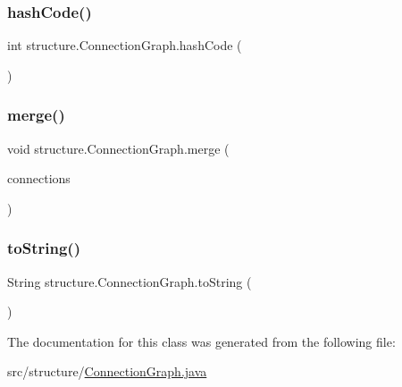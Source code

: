 \mbox{\label{classstructure_1_1_connection_graph_af352a3e79444b178fc8edef545086836}} 
\subsubsection{\texorpdfstring{hash\+Code()}{hashCode()}}
{\footnotesize\ttfamily int structure.\+Connection\+Graph.\+hash\+Code (\begin{DoxyParamCaption}{ }\end{DoxyParamCaption})}

\mbox{\label{classstructure_1_1_connection_graph_a96375503c72465740c4919c207619744}} 
\subsubsection{\texorpdfstring{merge()}{merge()}}
{\footnotesize\ttfamily void structure.\+Connection\+Graph.\+merge (\begin{DoxyParamCaption}\item[{\hyperlink{classstructure_1_1_connection_graph}{Connection\+Graph}}]{connections }\end{DoxyParamCaption})}

\mbox{\label{classstructure_1_1_connection_graph_afa0d01d543f0f89f713a3825cf14521e}} 
\subsubsection{\texorpdfstring{to\+String()}{toString()}}
{\footnotesize\ttfamily String structure.\+Connection\+Graph.\+to\+String (\begin{DoxyParamCaption}{ }\end{DoxyParamCaption})}



The documentation for this class was generated from the following file\+:\begin{DoxyCompactItemize}
\item 
src/structure/\hyperlink{_connection_graph_8java}{Connection\+Graph.\+java}\end{DoxyCompactItemize}
